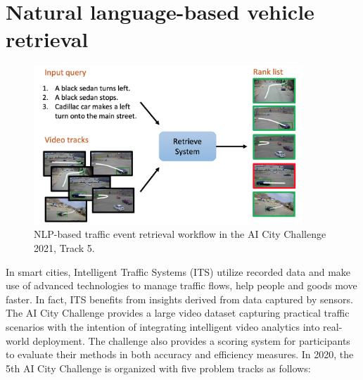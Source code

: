 \section{Natural language-based vehicle retrieval}
\label{sec:ai_city}
\begin{figure}[!ht]
    \centering
    \includegraphics[width=0.9\textwidth]{images/problem_statement.png}
    \caption{NLP-based traffic event retrieval workflow in the AI City Challenge 2021, Track 5.}
    \label{fig:problem_statement}
\end{figure}
In smart cities, Intelligent Traffic Systems (ITS) utilize recorded data and make use of advanced technologies to manage traffic flows, help people and goods move faster. In fact, ITS benefits from insights derived from data captured by sensors. The AI City Challenge \cite{Naphade21AIC21} provides a large video dataset capturing practical traffic scenarios with the intention of integrating intelligent video analytics into real-world deployment. The challenge also provides a scoring system for participants to evaluate their methods in both accuracy and efficiency measures. In 2020, the 5th AI City Challenge is organized with five problem tracks as follows:
